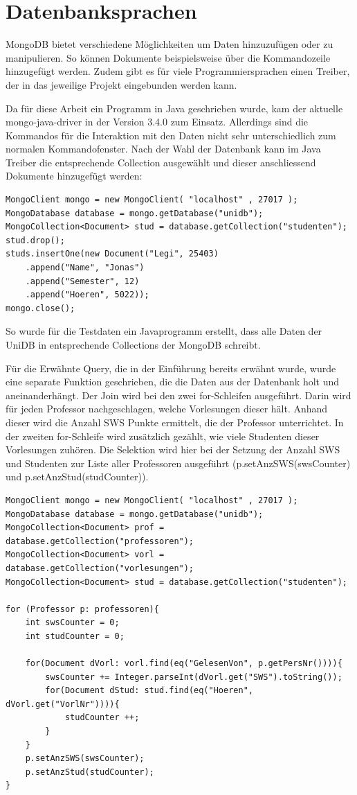 \section{Datenbanksprachen}
\label{kap:Datenbanksprachen}
 
MongoDB bietet verschiedene Möglichkeiten um Daten hinzuzufügen oder zu manipulieren. So können Dokumente beispielsweise über die Kommandozeile hinzugefügt werden. Zudem gibt es für viele Programmiersprachen einen Treiber, der in das jeweilige Projekt eingebunden werden kann. 
 
Da für diese Arbeit ein Programm in Java geschrieben wurde, kam der aktuelle mongo-java-driver in der Version 3.4.0 zum Einsatz. Allerdings sind die Kommandos für die Interaktion mit den Daten nicht sehr unterschiedlich zum normalen Kommandofenster. Nach der Wahl der Datenbank kann im Java Treiber  die entsprechende Collection ausgewählt und dieser anschliessend Dokumente hinzugefügt werden:
 
\begin{lstlisting}[basicstyle=\scriptsize]
MongoClient mongo = new MongoClient( "localhost" , 27017 );
MongoDatabase database = mongo.getDatabase("unidb");
MongoCollection<Document> stud = database.getCollection("studenten");
stud.drop();
studs.insertOne(new Document("Legi", 25403)
	.append("Name", "Jonas")
	.append("Semester", 12)
	.append("Hoeren", 5022));
mongo.close();
\end{lstlisting}

So wurde für die Testdaten ein Javaprogramm erstellt, dass alle Daten der UniDB in entsprechende Collections der MongoDB schreibt.

Für die Erwähnte Query, die in der Einführung bereits erwähnt wurde, wurde eine separate Funktion geschrieben, die die Daten aus der Datenbank holt und aneinanderhängt. Der Join wird bei den zwei for-Schleifen ausgeführt. Darin wird für jeden Professor nachgeschlagen, welche Vorlesungen dieser hält. Anhand dieser wird die Anzahl SWS Punkte ermittelt, die der Professor unterrichtet. In der zweiten for-Schleife wird zusätzlich gezählt, wie viele Studenten dieser Vorlesungen zuhören. Die Selektion wird hier bei der Setzung der Anzahl SWS und Studenten zur Liste aller Professoren ausgeführt (p.setAnzSWS(swsCounter) und p.setAnzStud(studCounter)). 

\begin{lstlisting}[basicstyle=\scriptsize]
MongoClient mongo = new MongoClient( "localhost" , 27017 );
MongoDatabase database = mongo.getDatabase("unidb");
MongoCollection<Document> prof = database.getCollection("professoren");
MongoCollection<Document> vorl = database.getCollection("vorlesungen");
MongoCollection<Document> stud = database.getCollection("studenten");

for (Professor p: professoren){
	int swsCounter = 0;
	int studCounter = 0;
	
	for(Document dVorl: vorl.find(eq("GelesenVon", p.getPersNr()))){
		swsCounter += Integer.parseInt(dVorl.get("SWS").toString());
		for(Document dStud: stud.find(eq("Hoeren", dVorl.get("VorlNr")))){
			studCounter ++;
		}
	}
	p.setAnzSWS(swsCounter);
	p.setAnzStud(studCounter);
}
\end{lstlisting}
 
